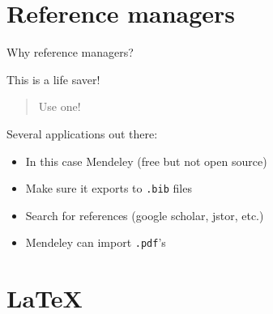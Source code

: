 \documentclass[ignorenonframetext,]{beamer}
\begin{document}
\section{Reference managers}\label{reference-managers}

\begin{frame}{Why reference managers?}

This is a life saver!

\begin{quote}
Use one!
\end{quote}

Several applications out there:

\begin{itemize}
\itemsep1pt\parskip0pt
\item
  In this case Mendeley (free but not open source)
\item
  Make sure it exports to \texttt{.bib} files
\item
  Search for references (google scholar, jstor, etc.)
\item
  Mendeley can import \texttt{.pdf}'s
\end{itemize}

\end{frame}

\section{\LaTeX}\label{section}
\end{document}
